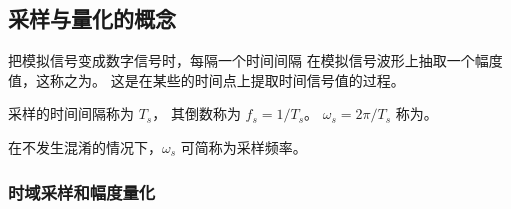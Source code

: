 \subsection{采样与量化的概念}

\begin{definition}[采样]
    把模拟信号变成数字信号时，每隔一个时间间隔
    在模拟信号波形上抽取一个幅度值，这称之为。
    这是在某些的时间点上提取时间信号值的过程。

    采样的时间间隔称为 $T_s$，
    其倒数称为 $f_s = 1/T_s$。
    $\omega_s = 2\pi / T_s$ 称为。
\end{definition}

\begin{remark}
    在不发生混淆的情况下，$\omega_s$ 可简称为采样频率。
\end{remark}

\subsubsection{时域采样和幅度量化}

